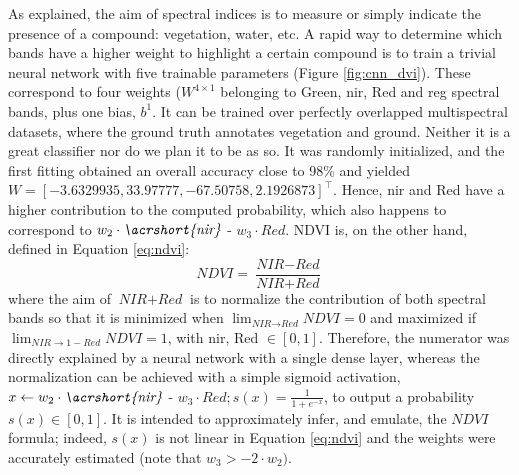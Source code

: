 \begin{kaobox}[frametitle=Activation of relevant spectral bands]
As explained, the aim of spectral indices is to measure or simply indicate the presence of a compound: vegetation, water, etc. A rapid way to determine which bands have a higher weight to highlight a certain compound is to train a trivial neural network with five trainable parameters (Figure \ref{fig:cnn_dvi}). These correspond to four weights ($W^{4\times1}$ belonging to Green, \acrshort{nir}, Red and \acrshort{reg} spectral bands, plus one bias, $b^{1}$. It can be trained over perfectly overlapped multispectral datasets, where the ground truth annotates vegetation and ground. Neither it is a great classifier nor do we plan it to be as so. It was randomly initialized, and the first fitting obtained an overall accuracy close to 98\% and yielded $W = \left[-3.6329935, 33.97777, -67.50758, 2.1926873\right]^{\intercal}$. Hence, \acrshort{nir} and Red have a higher contribution to the computed probability, which also happens to correspond to $w_2 \cdot \textit{\acrshort{nir}}$ - $w_3 \cdot \textit{Red}$. NDVI is, on the other hand, defined in Equation \ref{eq:ndvi}:
\begin{equation}
    \textit{NDVI} = \frac{\textit{NIR} - \textit{Red}}{\textit{NIR} + \textit{Red}}
    \label{eq:ndvi}
\end{equation}
where the aim of $\textit{NIR} + \textit{Red}$ is to normalize the contribution of both spectral bands so that it is minimized when $\lim_{\textit{NIR} \to \textit{Red}} \textit{NDVI} = 0$ and maximized if $\lim_{\textit{NIR} \to 1 - \textit{Red}} \textit{NDVI} = 1$, with \acrshort{nir}, Red $\in [0, 1]$. Therefore, the numerator was directly explained by a neural network with a single dense layer, whereas the normalization can be achieved with a simple sigmoid activation, $x \gets w_2 \cdot \textit{\acrshort{nir}}$ - $w_3 \cdot \textit{Red}; s(x) =  \frac{1}{1 + e^{-x}}$, to output a probability $s(x) \in [0, 1]$. It is intended to approximately infer, and emulate, the $\textit{NDVI}$ formula; indeed, $s(x)$ is not linear in Equation \ref{eq:ndvi} and the weights were accurately estimated (note that $w_3 > -2 \cdot w_2)$.  
\end{kaobox}

